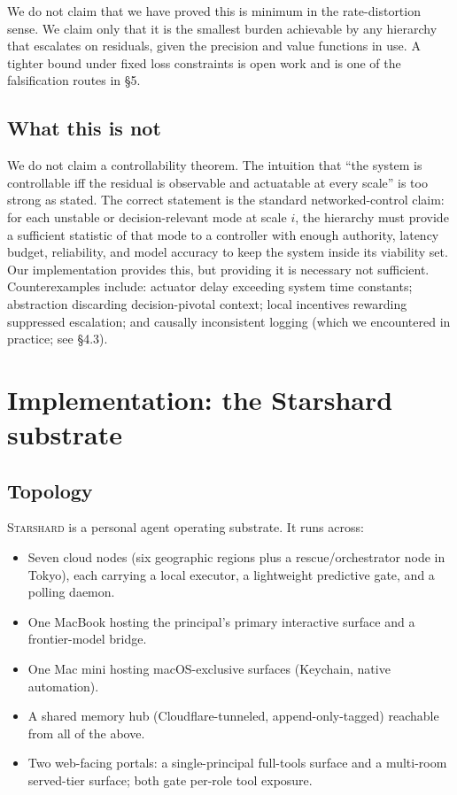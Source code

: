 \documentclass[11pt]{article}
\begin{document}
We do not claim that we have proved this is minimum in the rate-distortion sense. We claim only that it is the smallest burden achievable by any hierarchy that escalates on residuals, given the precision and value functions in use. A tighter bound under fixed loss constraints is open work and is one of the falsification routes in §5.

\subsection{What this is not}

We do not claim a controllability theorem. The intuition that ``the system is controllable iff the residual is observable and actuatable at every scale'' is too strong as stated. The correct statement is the standard networked-control claim: for each unstable or decision-relevant mode at scale $i$, the hierarchy must provide a sufficient statistic of that mode to a controller with enough authority, latency budget, reliability, and model accuracy to keep the system inside its viability set. Our implementation provides this, but providing it is necessary not sufficient. Counterexamples include: actuator delay exceeding system time constants; abstraction discarding decision-pivotal context; local incentives rewarding suppressed escalation; and causally inconsistent logging (which we encountered in practice; see §4.3).

\section{Implementation: the Starshard substrate}

\subsection{Topology}

\textsc{Starshard} is a personal agent operating substrate. It runs across:
\begin{itemize}[leftmargin=2em, itemsep=0.1em]
  \item Seven cloud nodes (six geographic regions plus a rescue/orchestrator node in Tokyo), each carrying a local executor, a lightweight predictive gate, and a polling daemon.
  \item One MacBook hosting the principal's primary interactive surface and a frontier-model bridge.
  \item One Mac mini hosting macOS-exclusive surfaces (Keychain, native automation).
  \item A shared memory hub (Cloudflare-tunneled, append-only-tagged) reachable from all of the above.
  \item Two web-facing portals: a single-principal full-tools surface and a multi-room served-tier surface; both gate per-role tool exposure.
\end{itemize}
\end{document}
